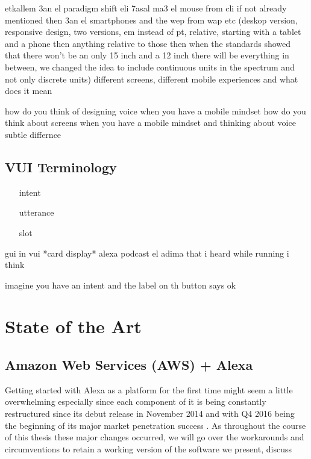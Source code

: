 etkallem 3an el paradigm shift eli 7asal ma3 el mouse from cli if not already mentioned
then 3an el smartphones and the wep from wap etc (deskop version, responsive design, two versions, em instead of pt, relative, starting with a tablet and a phone then anything relative to those then when the standards showed that there won't be an only 15 inch and a 12 inch there will be everything in between, we changed the idea to include continuous units in the spectrum and not only discrete units)
\cite{alexa_19}
different screens, different mobile experiences and what does it mean

how do you think of designing voice when you have a mobile mindset
how do you think about screens when you have a mobile mindset and thinking about voice
subtle differnce



\subsection{VUI Terminology} 
\begin{itemize}
	\item[intent]
	\item[utterance]
	\item [slot]
\end{itemize}


gui in vui *card display* alexa podcast el adima that i heard while running i think


imagine you have an intent and the label on th button says ok

\section{State of the Art}


\subsection*{Amazon Web Services (AWS) + Alexa}


Getting started with Alexa as a platform for the first time might seem a little overwhelming especially since each component of it is being  constantly restructured since its debut release in November 2014 and with Q4 2016 being the beginning of its major market penetration success \cite{gartnerpreds17}. %
As throughout the course of this thesis these major changes occurred, %
 we will go over the workarounds and circumventions to retain a working version of the software we present, discuss


